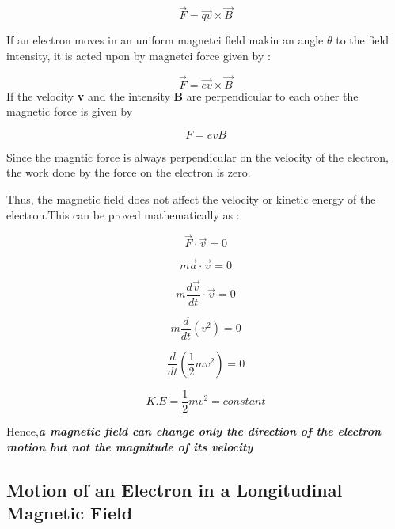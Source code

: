 \documentclass[a4paper,20pt,twoside]{report}
\begin{document}
	\begin{equation}
	\vec{F} = \vec{qv} \times \vec{B}
	\end{equation}
	
	If an electron moves in an uniform magnetci field makin an angle $\theta$ to the field intensity, it is acted upon by magnetci force given by : 
	
	\begin{equation}
	\vec{F} = \vec{ev} \times \vec{B}
	\end{equation}
	If the velocity \textbf{v} and the intensity \textbf{B} are perpendicular to each other the magnetic
	force is given by 
	
	\begin{equation}
	F = evB
	\end{equation}
	
	Since the magntic force is always perpendicular on the velocity of the electron, the work done by the force on the electron is zero.
	
	Thus, the magnetic field does not affect the velocity or kinetic energy of the electron.This can be proved mathematically as : 
	
	\begin{equation}
	\vec{F} \cdot \vec{v} = 0 
	\end{equation}
	
	\begin{equation}
	m\vec{a} \cdot  \vec{v} = 0
	\end{equation}
	
	\begin{equation}
	m\frac{d\vec{v}}{dt} \cdot \vec{v} = 0
	\end{equation}
	
	\begin{equation}
	m\frac{d}{dt}\left(v^2\right) = 0 
	\end{equation}
	
	\begin{equation}
	\frac{d}{dt}\left(\frac{1}{2}mv^2\right) = 0
	\end{equation}
	
	\begin{equation}
	K.E = \frac{1}{2}mv^2 = constant
	\end{equation}
	
	Hence,\textbf{\textit{a magnetic field can change only the direction of the electron motion but not the magnitude of its velocity}}
	
	\subsection{Motion of an Electron in a Longitudinal Magnetic Field}
	
  	
\end{document}
